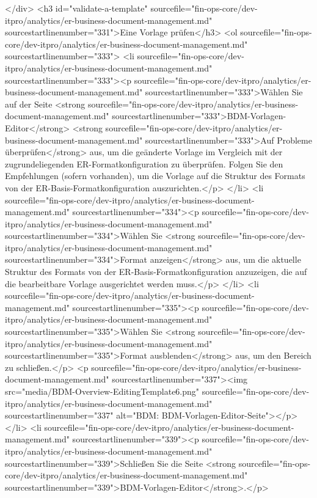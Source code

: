 </div>
<h3 id="validate-a-template" sourcefile="fin-ops-core/dev-itpro/analytics/er-business-document-management.md" sourcestartlinenumber="331">Eine Vorlage prüfen</h3>
<ol sourcefile="fin-ops-core/dev-itpro/analytics/er-business-document-management.md" sourcestartlinenumber="333">
<li sourcefile="fin-ops-core/dev-itpro/analytics/er-business-document-management.md" sourcestartlinenumber="333"><p sourcefile="fin-ops-core/dev-itpro/analytics/er-business-document-management.md" sourcestartlinenumber="333">Wählen Sie auf der Seite <strong sourcefile="fin-ops-core/dev-itpro/analytics/er-business-document-management.md" sourcestartlinenumber="333">BDM-Vorlagen-Editor</strong> <strong sourcefile="fin-ops-core/dev-itpro/analytics/er-business-document-management.md" sourcestartlinenumber="333">Auf Probleme überprüfen</strong> aus, um die geänderte Vorlage im Vergleich mit der zugrundeliegenden ER-Formatkonfiguration zu überprüfen. Folgen Sie den Empfehlungen (sofern vorhanden), um die Vorlage auf die Struktur des Formats von der ER-Basis-Formatkonfiguration auszurichten.</p>
</li>
<li sourcefile="fin-ops-core/dev-itpro/analytics/er-business-document-management.md" sourcestartlinenumber="334"><p sourcefile="fin-ops-core/dev-itpro/analytics/er-business-document-management.md" sourcestartlinenumber="334">Wählen Sie <strong sourcefile="fin-ops-core/dev-itpro/analytics/er-business-document-management.md" sourcestartlinenumber="334">Format anzeigen</strong> aus, um die aktuelle Struktur des Formats von der ER-Basis-Formatkonfiguration anzuzeigen, die auf die bearbeitbare Vorlage ausgerichtet werden muss.</p>
</li>
<li sourcefile="fin-ops-core/dev-itpro/analytics/er-business-document-management.md" sourcestartlinenumber="335"><p sourcefile="fin-ops-core/dev-itpro/analytics/er-business-document-management.md" sourcestartlinenumber="335">Wählen Sie <strong sourcefile="fin-ops-core/dev-itpro/analytics/er-business-document-management.md" sourcestartlinenumber="335">Format ausblenden</strong> aus, um den Bereich zu schließen.</p>
<p sourcefile="fin-ops-core/dev-itpro/analytics/er-business-document-management.md" sourcestartlinenumber="337"><img src="media/BDM-Overview-EditingTemplate6.png" sourcefile="fin-ops-core/dev-itpro/analytics/er-business-document-management.md" sourcestartlinenumber="337" alt="BDM: BDM-Vorlagen-Editor-Seite"></p>
</li>
<li sourcefile="fin-ops-core/dev-itpro/analytics/er-business-document-management.md" sourcestartlinenumber="339"><p sourcefile="fin-ops-core/dev-itpro/analytics/er-business-document-management.md" sourcestartlinenumber="339">Schließen Sie die Seite <strong sourcefile="fin-ops-core/dev-itpro/analytics/er-business-document-management.md" sourcestartlinenumber="339">BDM-Vorlagen-Editor</strong>.</p>
